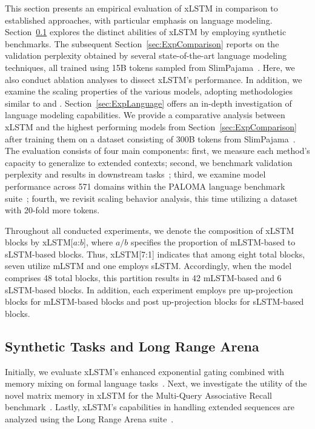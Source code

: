 This section presents an empirical evaluation of xLSTM in comparison to established approaches, with particular emphasis on language modeling. Section~\ref{sec:ExpSyntethic} explores the distinct abilities of xLSTM by employing synthetic benchmarks. 
The subsequent Section~\ref{sec:ExpComparison} reports on the validation perplexity obtained by several state-of-the-art language modeling techniques, all trained using 15B tokens sampled from SlimPajama~\citep{Soboleva:23}. Here, we also conduct ablation analyses to dissect xLSTM's performance. In addition, we examine the scaling properties of the various models, adopting methodologies similar to \citet{Kaplan:20} and \citet{Brown:20short}.
Section~\ref{sec:ExpLanguage} 
offers an in-depth investigation of language modeling capabilities. We provide a comparative analysis between xLSTM and the highest performing models from Section~\ref{sec:ExpComparison} after training them on a dataset consisting of 300B tokens from SlimPajama~\citep{Soboleva:23}. The evaluation consists of four main components: first, we measure each method's capacity to generalize to extended contexts; second, we benchmark validation perplexity and results in downstream tasks~\citep{Sutawika:24}; third, we examine model performance across 571 domains within the PALOMA language benchmark suite~\citep{Magnusson:23arxivshort}; fourth, we revisit scaling behavior analysis, this time utilizing a dataset with 20-fold more tokens.

\label{sec:xlstm_blocks_notation}
Throughout all conducted experiments, we denote the composition of xLSTM blocks by xLSTM[$a$:$b$], where $a/b$ specifies the proportion of mLSTM-based to sLSTM-based blocks. Thus, xLSTM[7:1] indicates that among eight total blocks, seven utilize mLSTM and one employs sLSTM. Accordingly, when the model comprises 48 total blocks, this partition results in 42 mLSTM-based and 6 sLSTM-based blocks. In addition, each experiment employs pre up-projection blocks for mLSTM-based blocks and post up-projection blocks for sLSTM-based blocks.

\subsection{Synthetic Tasks and Long Range Arena}
\label{sec:ExpSyntethic}
Initially, we evaluate xLSTM's enhanced exponential gating combined with memory mixing on formal language tasks~\citep{Deletang:23}. Next, we investigate the utility of the novel matrix memory in xLSTM for the Multi-Query Associative Recall benchmark~\citep{Arora:23arxiv}. Lastly, xLSTM's capabilities in handling extended sequences are analyzed using the Long Range Arena suite~\citep{Tay:21}.

